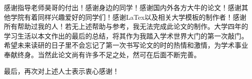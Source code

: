 \begin{acknowledgement}
    感谢指导老师昊哥的付出！感谢身边的同学！感谢国内外各方大牛的论文！感谢其他学院有着同样兴趣爱好的同学们！感谢LaTex以及相关大学模板的制作者！感谢所有帮助过我的人！若无上述帮助与参考，我无法完成此论文的制作。大学四年的学习生活以本文作出的最后的总结，将其作为我踏入学术世界大门的第一次敲门。希望未来读研的日子里不会忘记了第一次书写论文的时的热情和激情，为学术事业奉献终身。当然此论文尚有许多不足之处，然可在后面不断完善。
    
    最后，再次对上述人士表示衷心感谢！
\end{acknowledgement}